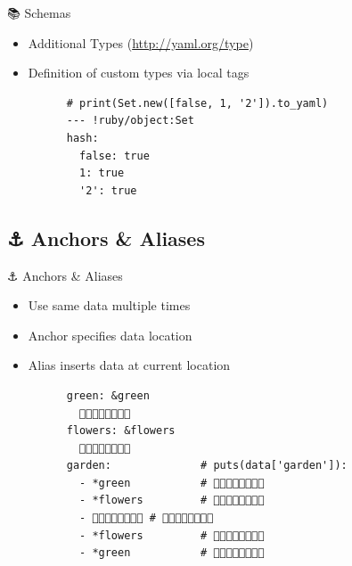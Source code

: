 \documentclass{beamer}
\newcommand{\code}[1]{
  \codebox{\texttt|#1|}
}
\begin{document}
\begin{frame}{📚 Schemas}
  \newpage
  \begin{itemize}
    \item Additional Types (\textcolor{orange}{\url{http://yaml.org/type}})
    \item Definition of custom types via local tags\\[0.5cm]
    \begin{verbatim}
      # print(Set.new([false, 1, '2']).to_yaml)
      --- !ruby/object:Set
      hash:
        false: true
        1: true
        '2': true
    \end{verbatim}
  \end{itemize}
\end{frame}

\subsection{⚓️ Anchors \& Aliases}

\begin{frame}[fragile]{⚓️ Anchors \& Aliases}
  \begin{itemize}
    \item Use same data multiple times
    \item Anchor \code{&name} specifies data location
    \item Alias \code{*name} inserts data at current location~\\[0.5cm]
    \begin{verbatim}
      green: &green
        🌳🌱🌿🌱🌿🌱🌿🌳
      flowers: &flowers
        🌳🌸🌼🌻🌺🌼🌸🌳
      garden:              # puts(data['garden']):
        - *green           # 🌳🌱🌿🌱🌿🌱🌿🌳
        - *flowers         # 🌳🌸🌼🌻🌺🌼🌸🌳
        - 🌳🌱🐞🌱🌱🐛🌱🌳 # 🌳🌱🐞🌱🌱🐛🌱🌳
        - *flowers         # 🌳🌸🌼🌻🌺🌼🌸🌳
        - *green           # 🌳🌱🌿🌱🌿🌱🌿🌳
    \end{verbatim}
  \end{itemize}
\end{frame}
\end{document}
